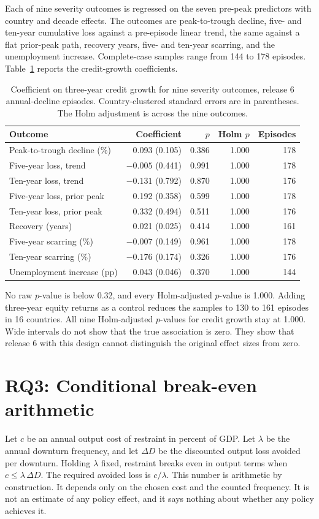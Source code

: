 \documentclass[11pt]{article}
\begin{document}
Each of nine severity outcomes is regressed on the seven pre-peak predictors with country
and decade effects. The outcomes are peak-to-trough decline, five- and ten-year cumulative
loss against a pre-episode linear trend, the same against a flat prior-peak path, recovery
years, five- and ten-year scarring, and the unemployment increase. Complete-case samples
range from 144 to 178 episodes. Table~\ref{tab:severity} reports the credit-growth
coefficients.

\begin{table}[htbp]
\centering
\small
\caption{Coefficient on three-year credit growth for nine severity outcomes, release 6
annual-decline episodes. Country-clustered standard errors are in parentheses. The Holm
adjustment is across the nine outcomes.}
\label{tab:severity}
\begin{tabular}{lrrrr}
\toprule
Outcome & Coefficient & $p$ & Holm $p$ & Episodes \\
\midrule
Peak-to-trough decline (\%) & 0.093 (0.105) & 0.386 & 1.000 & 178 \\
Five-year loss, trend & $-0.005$ (0.441) & 0.991 & 1.000 & 178 \\
Ten-year loss, trend & $-0.131$ (0.792) & 0.870 & 1.000 & 176 \\
Five-year loss, prior peak & 0.192 (0.358) & 0.599 & 1.000 & 178 \\
Ten-year loss, prior peak & 0.332 (0.494) & 0.511 & 1.000 & 176 \\
Recovery (years) & 0.021 (0.025) & 0.414 & 1.000 & 161 \\
Five-year scarring (\%) & $-0.007$ (0.149) & 0.961 & 1.000 & 178 \\
Ten-year scarring (\%) & $-0.176$ (0.174) & 0.326 & 1.000 & 176 \\
Unemployment increase (pp) & 0.043 (0.046) & 0.370 & 1.000 & 144 \\
\bottomrule
\end{tabular}
\end{table}

No raw $p$-value is below 0.32, and every Holm-adjusted $p$-value is 1.000. Adding
three-year equity returns as a control reduces the samples to 130 to 161 episodes in 16
countries. All nine Holm-adjusted $p$-values for credit growth stay at 1.000. Wide intervals
do not show that the true association is zero. They show that release 6 with this design
cannot distinguish the original effect sizes from zero.

\section{RQ3: Conditional break-even arithmetic}
Let $c$ be an annual output cost of restraint in percent of GDP. Let $\lambda$ be the annual
downturn frequency, and let $\Delta D$ be the discounted output loss avoided per downturn.
Holding $\lambda$ fixed, restraint breaks even in output terms when $c \le \lambda\,\Delta D$.
The required avoided loss is $c/\lambda$. This number is arithmetic by construction. It
depends only on the chosen cost and the counted frequency. It is not an estimate of any
policy effect, and it says nothing about whether any policy achieves it.
\end{document}
